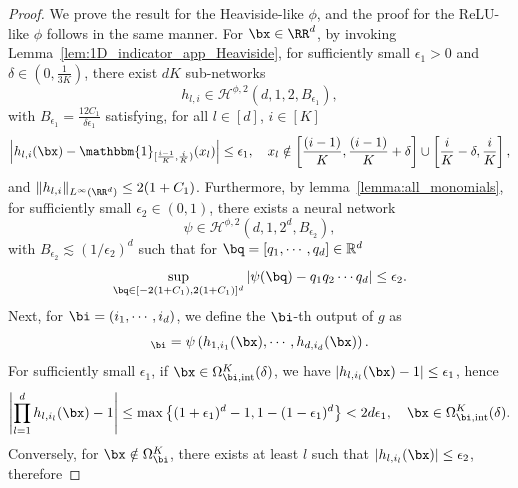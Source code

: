 \documentclass[11pt]{article}
\begin{document}
\begin{proof}
   We prove the result for the Heaviside-like $\phi$, and the proof for the ReLU-like $\phi$ follows in the same manner. For $\bx\in\RR^d$, by invoking Lemma~\ref{lem:1D_indicator_app_Heaviside}, for sufficiently small $\epsilon_1 >0$ and $\delta \in (0, \frac{1}{3K})$, there exist $dK$ sub-networks 
    \begin{equation*}
        h_{l,i} \in \mathcal{H}^{\phi,2}\left( d, 1, 2,  B_{\epsilon_1}\right),
    \end{equation*}
    with $B_{\epsilon_1} = \frac{12C_1}{\delta \epsilon_1}$ satisfying, for all $l \in [d]$, $i \in [K]$
    \begin{equation*}
        \left| h_{l,i}(\bx) - \mathbbm{1}_{[\frac{i-1}{K},\frac{i}{K})} (x_l)\right| \leq \epsilon_1, \quad x_l \notin \left[\frac{(i-1)}{K}, \frac{(i-1)}{K} + \delta\right] \cup \left[ \frac{i}{K}-\delta, \frac{i}{K} \right],
    \end{equation*}
    and $\|h_{l,i}\|_{L^{\infty}(\RR^d)} \leq 2(1+C_1)$. Furthermore, by lemma~\ref{lemma:all_monomials}, for sufficiently small $\epsilon_2 \in (0,1)$, there exists a neural network 
    \begin{equation*}
        \psi \in \mathcal{H}^{\phi,2}(d, 1,2^d, B_{\epsilon_2}),
    \end{equation*}
    with $B_{\epsilon_2} \lesssim (1 / \epsilon_2)^d$
    such that for $\bq = [q_1, \cdots, q_d] \in \mathbb{R}^d$
    \begin{equation*}
        \sup_{\bq \in [-2(1+C_1), 2(1+C_1)]^d} \left| \psi(\bq) - q_1 q_2 \cdots q_d \right| \leq \epsilon_2.
    \end{equation*}
    Next, for $\bi = (i_1, \cdots, i_d)$, we define the $\bi$-th output of $g$ as 
    \begin{equation*}
        [g(\bx)]_{\bi} = \psi \left( h_{1, i_1}(\bx), \cdots, h_{d,i_d}(\bx)\right).
    \end{equation*}
    For sufficiently small $\epsilon_1$, if $\bx \in \Omega_{\bi, \mathrm{int}}^{K}(\delta)$, we have $|h_{l,i_l}(\bx) - 1| \leq \epsilon_1$, hence
    \begin{equation*}
        \left| \prod_{l=1}^d h_{l,i_l}(\bx) - 1\right| \leq \max \left\{ (1+\epsilon_1)^d-1, 1 -(1-\epsilon_1)^d\right\} < 2d \epsilon_1, \quad \bx \in \Omega_{\bi, \mathrm{int}}^{K}(\delta).
    \end{equation*}
    Conversely, for $\bx \notin \Omega_{\bi}^{K}$, there exists at least $l$ such that $|h_{l, i_l}(\bx)| \leq \epsilon_2$, therefore 

\end{proof}
\end{document}

